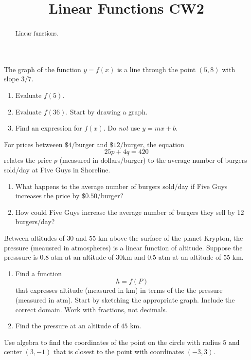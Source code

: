 \documentclass{ximera}
\title{Linear Functions CW2}
\begin{document}
\begin{abstract}
Linear functions.
\end{abstract}
\maketitle


\begin{question} \label{Qpf3b}
The graph of the function $y=f(x)$ is a line through the point $(5,8)$ with slope $3/7$.

\begin{enumerate}
\item Evaluate $f(5)$.

\item Evaluate $f(36)$. Start by drawing a graph.

\item Find an expression for $f(x)$. Do \emph{not} use $y=mx+b$.
\end{enumerate}

\end{question}

\begin{question} \label{QPfef30}
For prices betweeen $\$4$/burger and $\$12$/burger, the equation
\[
     25p + 4q = 420
\]
relates the price $p$ (measured in dollars/burger) to the average number of burgers sold/day at Five Guys in Shoreline.

\begin{enumerate}
\item What happens to the average number of burgers sold/day if Five Guys increases the price by $\$0.50$/burger?

\item How could Five Guys increase the average number of burgers they sell by $12$ burgers/day? 
\end{enumerate}

\end{question}

\begin{question} \label{Qpffef0000}
Between altitudes of $30$ and $55$ km above the surface of the planet Krypton, the pressure (meausred in atmospheres) is a linear function of altitude. Suppose the presssure is $0.8$ atm at an altitude of $30$km and $0.5$ atm at an altitude of $55$ km.

\begin{enumerate}
\item Find a function
\[
        h = f(P) 
\]
that expresses altitude (measured in km) in terms of the the pressure (measured in atm). Start by sketching the appropriate graph.
Include the correct domain. Work with fractions, not decimals.

\item Find the pressure at an altitude of $45$ km.
\end{enumerate}
\end{question}

\begin{question}\label{Qmfem}
Use algebra to find the coordinates of the point on the circle with radius $5$ and center $(3,-1)$ that is closest to the point with coordinates $(-3,3)$.

\end{question}
\end{document}
